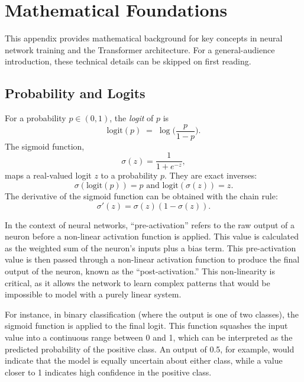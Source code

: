 \documentclass[%
  reprint,
  superscriptaddress,
  showpacs,
  showkeys,
  amsmath,amssymb,
  pra,
  longbibliography,
  floatfix,
  x11names
]{revtex4-2}
\begin{document}



\appendix

\section{Mathematical Foundations}
\label{app:math}

This appendix provides mathematical background for key concepts in neural network training and the Transformer architecture. For a general-audience introduction, these technical details can be skipped on first reading.

\subsection{Probability and Logits}

For a probability $p\in(0,1)$, the \emph{logit} of $p$ is
\begin{equation}
\text{logit}(p) \;=\; \log\!\Big(\frac{p}{1-p}\Big).
\label{eq:logit_def}
\end{equation}
The sigmoid function,
\begin{equation}
\sigma(z)=\frac{1}{1+e^{-z}},
\label{eq:sigmoid_def}
\end{equation}
maps a real-valued logit $z$ to a probability $p$.
They are exact inverses:
\begin{equation}
\sigma(\text{logit}(p)) = p \text{ and }\text{logit}(\sigma(z)) = z.
\label{eq:logit_sigmoid}
\end{equation}
The derivative of the sigmoid function can be obtained with the chain rule:
\begin{equation}
\sigma'(z) = \sigma(z)(1-\sigma(z)).
\label{eq:der_sigmoid}
\end{equation}

In the context of neural networks, ``pre-activation'' refers to the raw output of a neuron before a non-linear activation function is applied. This value is calculated as the weighted sum of the neuron's inputs plus a bias term. This pre-activation value is then passed through a non-linear activation function to produce the final output of the neuron, known as the ``post-activation.'' This non-linearity is critical, as it allows the network to learn complex patterns that would be impossible to model with a purely linear system.

For instance, in binary classification (where the output is one of two classes), the sigmoid function is applied to the final logit. This function squashes the input value into a continuous range between 0 and 1, which can be interpreted as the predicted probability of the positive class. An output of 0.5, for example, would indicate that the model is equally uncertain about either class, while a value closer to 1 indicates high confidence in the positive class.
\end{document}
